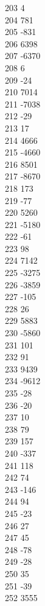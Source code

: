 { 203	4 \\
 204	781 \\
 205	-831 \\
 206	6398 \\
 207	-6370 \\
 208	6 \\
 209	-24 \\
 210	7014 \\
 211	-7038 \\
 212	-29 \\
 213	17 \\
 214	4666 \\
 215	-4660 \\
 216	8501 \\
 217	-8670 \\
 218	173 \\
 219	-77 \\
 220	5260 \\
 221	-5180 \\
 222	-61 \\
 223	98 \\
 224	7142 \\
 225	-3275 \\
 226	-3859 \\
 227	-105 \\
 228	26 \\
 229	5883 \\
 230	-5860 \\
 231	101 \\
 232	91 \\
 233	9439 \\
 234	-9612 \\
 235	-28 \\
 236	-20 \\
 237	10 \\
 238	79 \\
 239	157 \\
 240	-337 \\
 241	118 \\
 242	74 \\
 243	-146 \\
 244	94 \\
 245	-23 \\
 246	27 \\
 247	45 \\
 248	-78 \\
 249	-28 \\
 250	35 \\
 251	-39 \\
 252	3555 \\
}
